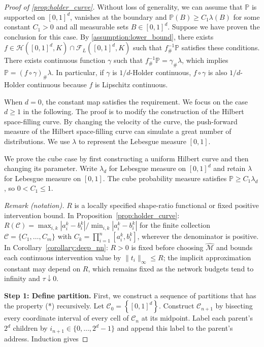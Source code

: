 \begin{proof}[Proof of \cref{prop:holder_curve}]\label{proof:holder_curve}
Without loss of generality, we can assume that $ \mathbb{P}$ is supported on $[0,1]^d$,  vanishes at the boundary and $\mathbb{P}(B) \geqslant C_1\lambda(B)$ for some constant $C_1>0$ and all measurable sets $B\in[0,1]^d$. Suppose we have proven the conclusion for this case. By \cref{assumption:lower_bound}, there exists $ f\in \mathcal{H}([0,1]^{d},K) \cap \mathcal{F}_L([0,1]^{d},K)$ such that $f^{-1}_{\#} \mathbb{P}$ satisfies these conditions. There exists continuous function $\gamma$ such that $f^{-1}_{\#}\mathbb{P}=\gamma_{\#}\lambda$, which implies $\mathbb{P} = (f\circ\gamma)_{\#}\lambda$. In particular, if $\gamma$ is $1/d$-Holder continuous, $f\circ\gamma$ is also $1/d$-Holder continuous because $f$ is Lipschitz continuous. 

When $d = 0$, the constant map satisfies the requirement. We focus on the case $d\geqslant 1$ in the following. The proof is to modify the construction of the Hilbert space-filling curve. By changing the velocity of the curve, the push-forward measure of the Hilbert space-filling curve can simulate a great number of distributions. We use $ \lambda $ to represent the Lebesgue measure $ [0,1] $. \par 

\label{fig:hilbert_curve}We prove the cube case by first constructing a uniform Hilbert curve and then changing its parameter. Write $\lambda_d$ for Lebesgue measure on $[0,1]^d$ and retain $\lambda$ for Lebesgue measure on $[0,1]$. The cube probability measure satisfies $\mathbb P\geqslant C_1\lambda_d$, so $0<C_1\leqslant1$. 

\noindent\textit{Remark (notation).} $R$ is a locally specified shape-ratio functional or fixed positive intervention bound. In Proposition~\ref{prop:holder_curve}: $R(\mathcal C)=\max_{i,k}|a_i^k-b_i^k|/\min_{i,k}|a_i^k-b_i^k|$ for the finite collection $\mathcal C=\{C_1,\ldots,C_m\}$ with $C_k=\prod_{i=1}^n[a_i^k,b_i^k]$, wherever the denominator is positive. In Corollary~\ref{corollary:deep_nn}: $R>0$ is fixed before choosing $\hat{\mathcal M}$ and bounds each continuous intervention value by $\|t_i\|_\infty\leqslant R$; the implicit approximation constant may depend on $R$, which remains fixed as the network budgets tend to infinity and $\tau\downarrow0$.


\textbf{Step 1: Define partition.}  
 First, we construct a sequence of partitions that has the property (*) recursively. Let $ \mathcal{C}_{0} =\left\{[ 0,1]^{d}\right\}$. Construct $\mathcal C_{n+1}$ by bisecting every coordinate interval of every cell of $\mathcal C_n$ at its midpoint. Label each parent's $2^d$ children by $i_{n+1}\in\{0,\ldots,2^d-1\}$ and append this label to the parent's address. Induction gives


\end{proof}
